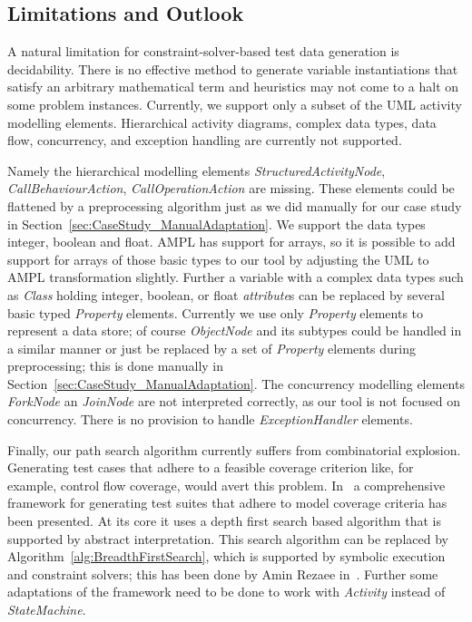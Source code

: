 \documentclass[runningheads,a4paper]{llncs}%
\newcommand{\UMLType}[1]{\textsf{\textit{#1}}} %
\newcommand{\UMLReference}[1]{\textsf{\textit{#1}}} %
\begin{document}
\subsection{Limitations and Outlook}
A natural limitation for constraint-solver-based test data generation is
decidability. There is no effective method to generate variable instantiations
that satisfy an arbitrary mathematical term and heuristics may not come to a
halt on some problem instances. Currently, we support only a subset of the UML
activity modelling elements. Hierarchical activity diagrams, complex data types,
data flow, concurrency, and exception handling are currently not supported.

Namely the hierarchical modelling elements \UMLType{StructuredActivityNode},
\UMLType{CallBehaviourAction}, \UMLType{CallOperationAction} are missing. These
elements could be flattened by a preprocessing algorithm just as we did manually
for our case study in Section~\ref{sec:CaseStudy_ManualAdaptation}. We support
the data types integer, boolean and float. AMPL has support for arrays, so it is
possible to add support for arrays of those basic types to our tool by adjusting
the UML to AMPL transformation slightly. Further a variable with a complex data
types such as \UMLType{Class} holding integer, boolean, or float
\UMLReference{attribute}s can be replaced by several basic typed
\UMLType{Property} elements. Currently we use only \UMLType{Property} elements
to represent a data store; of course \UMLType{ObjectNode} and its subtypes could
be handled in a similar manner or just be replaced by a set of
\UMLType{Property} elements during preprocessing; this is done manually in
Section~\ref{sec:CaseStudy_ManualAdaptation}. The concurrency modelling elements
\UMLType{ForkNode} an \UMLType{JoinNode} are not interpreted correctly, as our
tool is not focused on concurrency. There is no provision to handle
\UMLType{ExceptionHandler} elements.

Finally, our path search algorithm currently suffers from combinatorial
explosion. Generating test cases that adhere to a feasible coverage criterion
like, for example, control flow coverage, would avert this problem.
In~\cite{ParTeG} a comprehensive framework for generating test suites that
adhere to model coverage criteria has been presented. At its core it uses a
depth first search based algorithm that is supported by abstract interpretation.
This search algorithm can be replaced by Algorithm~\ref{alg:BreadthFirstSearch},
which is supported by symbolic execution and constraint solvers; this has been
done by Amin Rezaee in~\cite{Rezaee2014ANew}. Further some adaptations of the
framework need to be done to work with \UMLType{Activity} instead of
\UMLType{StateMachine}.
%
\end{document}

